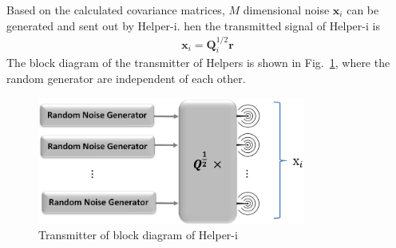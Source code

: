 \documentclass[conference]{IEEEtran}
\begin{document}
Based on the calculated covariance matrices,  $M$ dimensional noise $\mathbf{x}_i$ can be generated and sent out by Helper-i. hen the transmitted signal of Helper-i is 
\begin{eqnarray}
\mathbf{x}_i = \mathbf{Q}_i^{1/2}\mathbf{r}
\end{eqnarray} 
The block diagram of the transmitter of Helpers is shown in Fig.~\ref{fig:transmitter}, where the random generator are independent of each other.
\begin{figure}[h]
	\centering
	\includegraphics[width=8.8cm]{transmitter.png} %
	\caption{Transmitter of block diagram of Helper-i}
	\label{fig:transmitter}
\end{figure}
\end{document}
